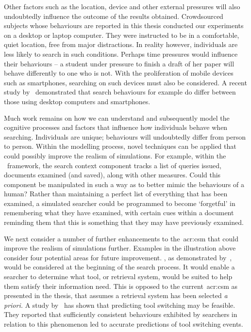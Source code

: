 Other factors such as the location, device and other external pressures will also undoubtedly influence the outcome of the results obtained. Crowdsourced subjects whose behaviours are reported in this thesis conducted our experiments on a desktop or laptop computer. They were instructed to be in a comfortable, quiet location, free from major distractions. In reality however, individuals are less likely to search in such conditions. Perhaps time pressures would influence their behaviours -- a student under pressure to finish a draft of her paper will behave differently to one who is not. With the proliferation of mobile devices such as smartphones, searching on such devices must also be considered. A recent study by~\cite{ong2017scent_behaviour} demonstrated that search behaviours for example do differ between those using desktop computers and smartphones.

Much work remains on how we can understand and subsequently model the cognitive processes and factors that influence how individuals behave when searching. Individuals are unique; behaviours will undoubtedly differ from person to person. Within the modelling process, novel techniques can be applied that could possibly improve the realism of simulations. For example, within the \simiir~framework, the search context component tracks a list of queries issued, documents examined (and saved), along with other measures. Could this component be manipulated in such a way as to better mimic the behaviours of a human? Rather than maintaining a perfect list of everything that has been examined, a simulated searcher could be programmed to become `forgetful' in remembering what they have examined, with certain cues within a document reminding them that this is something that they may have previously examined.

We next consider a number of further enhancements to the~\gls{acr:csm} that could improve the realism of simulations further. Examples in the illustration above consider four potential areas for future improvement. , as demonstrated by~\cite{thomas2014modelling_behaviour}, would be considered at the beginning of the search process. It would enable a searcher to determine what tool, or retrieval system, would be suited to help them satisfy their information need. This is opposed to the current~\gls{acr:csm} as presented in the thesis, that assumes a retrieval system has been selected \emph{a priori.} A study by~\cite{white2009tool_switching} has shown that predicting tool switching may be feasible. They reported that sufficiently consistent behaviours exhibited by searchers in relation to this phenomenon led to accurate predictions of tool switching events.

